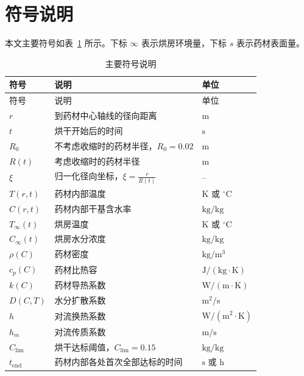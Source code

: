 \section{符号说明}

本文主要符号如表~\ref{tab:symbols} 所示。下标 $\infty$ 表示烘房环境量，下标 $s$ 表示药材表面量。

\begin{longtable}{>{\centering\arraybackslash}p{}p{}>{\centering\arraybackslash}p{}}
\caption{主要符号说明}\label{tab:symbols}\\
\toprule
符号 & 说明 & 单位 \\
\midrule
\endfirsthead
\toprule
符号 & 说明 & 单位 \\
\midrule
\endhead
$r$ & 到药材中心轴线的径向距离 & $\mathrm{m}$ \\
$t$ & 烘干开始后的时间 & $\mathrm{s}$ \\
$R_0$ & 不考虑收缩时的药材半径，$R_0=0.02$ & $\mathrm{m}$ \\
$R(t)$ & 考虑收缩时的药材半径 & $\mathrm{m}$ \\
$\xi$ & 归一化径向坐标，$\xi=\frac{r}{R(t)}$ & -- \\
$T(r,t)$ & 药材内部温度 & $\mathrm{K}$ 或 ${}^\circ\mathrm{C}$ \\
$C(r,t)$ & 药材内部干基含水率 & $\mathrm{kg/kg}$ \\
$T_\infty(t)$ & 烘房温度 & $\mathrm{K}$ 或 ${}^\circ\mathrm{C}$ \\
$C_\infty(t)$ & 烘房水分浓度 & $\mathrm{kg/kg}$ \\
$\rho(C)$ & 药材密度 & $\mathrm{kg/m^3}$ \\
$c_p(C)$ & 药材比热容 & $\mathrm{J/(kg\cdot K)}$ \\
$k(C)$ & 药材导热系数 & $\mathrm{W/(m\cdot K)}$ \\
$D(C,T)$ & 水分扩散系数 & $\mathrm{m^2/s}$ \\
$h$ & 对流换热系数 & $\mathrm{W/(m^2\cdot K)}$ \\
$h_m$ & 对流传质系数 & $\mathrm{m/s}$ \\
$C_{\mathrm{lim}}$ & 烘干达标阈值，$C_{\mathrm{lim}}=0.15$ & $\mathrm{kg/kg}$ \\
$t_{\mathrm{end}}$ & 药材内部各处首次全部达标的时间 & $\mathrm{s}$ 或 $\mathrm{h}$ \\
\bottomrule
\end{longtable}


